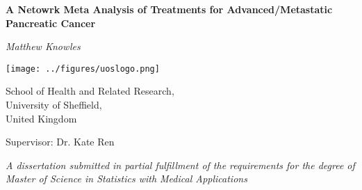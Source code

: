 \begin{titlepage}

    \begin{center}

        \vspace*{1.5cm}

        \textbf{\huge A Netowrk Meta Analysis of Treatments for Advanced/Metastatic Pancreatic Cancer } 
        
        \vspace*{1.5cm}
        
        \textit{Matthew Knowles}

        \vspace*{1.5cm}
    
        \texttt{[image: ../figures/uoslogo.png]}
        
        \vspace*{1.5cm}
        
        School of Health and Related Research, \\
        University of Sheffield, \\
        United Kingdom \\

        \vspace*{0.5cm}

        Supervisor: Dr. Kate Ren
        
        \vspace*{1.5cm}

        \textit{A dissertation submitted in partial fulfillment of the requirements for the degree of Master of Science in 
        Statistics with Medical Applications}
    \end{center}
    
\end{titlepage}
